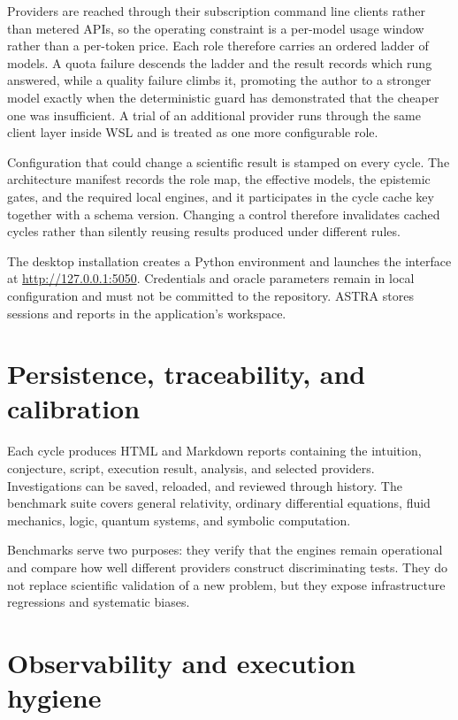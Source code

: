 \documentclass[11pt,a4paper]{article}
\begin{document}
Providers are reached through their subscription command line clients rather than metered APIs, so the operating constraint is a per-model usage window rather than a per-token price. Each role therefore carries an ordered ladder of models. A quota failure descends the ladder and the result records which rung answered, while a quality failure climbs it, promoting the author to a stronger model exactly when the deterministic guard has demonstrated that the cheaper one was insufficient. A trial of an additional provider runs through the same client layer inside WSL and is treated as one more configurable role.

Configuration that could change a scientific result is stamped on every cycle. The architecture manifest records the role map, the effective models, the epistemic gates, and the required local engines, and it participates in the cycle cache key together with a schema version. Changing a control therefore invalidates cached cycles rather than silently reusing results produced under different rules.

The desktop installation creates a Python environment and launches the interface at \url{http://127.0.0.1:5050}. Credentials and oracle parameters remain in local configuration and must not be committed to the repository. ASTRA stores sessions and reports in the application's workspace.

\section{Persistence, traceability, and calibration}

Each cycle produces HTML and Markdown reports containing the intuition, conjecture, script, execution result, analysis, and selected providers. Investigations can be saved, reloaded, and reviewed through history. The benchmark suite covers general relativity, ordinary differential equations, fluid mechanics, logic, quantum systems, and symbolic computation.

Benchmarks serve two purposes: they verify that the engines remain operational and compare how well different providers construct discriminating tests. They do not replace scientific validation of a new problem, but they expose infrastructure regressions and systematic biases.

\section{Observability and execution hygiene}
\end{document}
